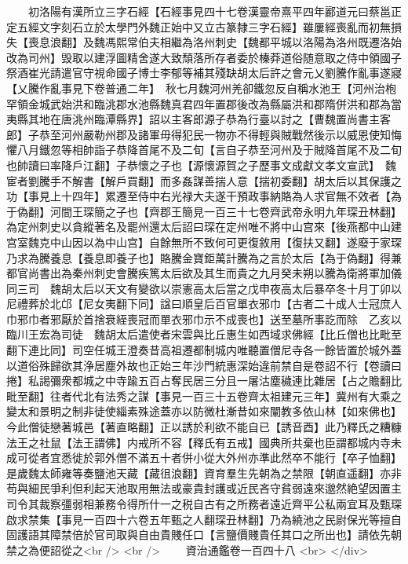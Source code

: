 　　初洛陽有漢所立三字石經【石經事見四十七卷漢靈帝熹平四年酈道元曰蔡邕正定五經文字刻石立於太學門外魏正始中又立古篆隸三字石經】雖屢經喪亂而初無損失【喪息浪翻】及魏馮熙常伯夫相繼為洛州刺史【魏都平城以洛陽為洛州既遷洛始改為司州】毁取以建浮圖精舍遂大致頹落所存者委於榛莽道俗随意取之侍中領國子祭酒崔光請遣官守視命國子博士李郁等補其殘缺胡太后許之會元乂劉騰作亂事遂寢【乂騰作亂事見下卷普通二年】　秋七月魏河州羌卻鐵忽反自稱水池王【河州治枹罕領金城武始洪和臨洮郡水池縣魏真君四年置郡後改為縣屬洪和郡隋併洪和郡為當夷縣其地在唐洮州臨潭縣界】詔以主客郎源子恭為行臺以討之【曹魏置尚書主客郎】子恭至河州嚴勒州郡及諸軍毋得犯民一物亦不得輕與賊戰然後示以威恩使知悔懼八月鐵忽等相帥詣子恭降首尾不及二旬【言自子恭至河州及于賊降首尾不及二旬也帥讀曰率降戶江翻】子恭懷之子也【源懷源賀之子歷事文成獻文孝文宣武】　魏宦者劉騰手不解書【解戶買翻】而多姦謀善揣人意【揣初委翻】胡太后以其保護之功【事見上十四年】累遷至侍中右光禄大夫遂干預政事納賂為人求官無不效者【為于偽翻】河間王琛簡之子也【齊郡王簡見一百三十七卷齊武帝永明九年琛丑林翻】為定州刺史以貪縱著名及罷州還太后詔曰琛在定州唯不將中山宫來【後燕都中山建宫室魏克中山因以為中山宫】自餘無所不致何可更復敘用【復扶又翻】遂廢于家琛乃求為騰養息【養息即養子也】賂騰金寶鉅萬計騰為之言於太后【為于偽翻】得兼都官尚書出為秦州刺史會騰疾篤太后欲及其生而貴之九月癸未朔以騰為衛將軍加儀同三司　魏胡太后以天文有變欲以崇憲高太后當之戊申夜高太后暴卒冬十月丁卯以尼禮葬於北邙【尼女夷翻下同】諡曰順皇后百官單衣邪巾【古者二十成人士冠庶人巾邪巾者邪厭於首捨衰絰喪冠而單衣邪巾示不成喪也】送至墓所事訖而除　乙亥以臨川王宏為司徒　魏胡太后遣使者宋雲與比丘惠生如西域求佛經【比丘僧也比毗至翻下連比同】司空任城王澄奏昔高祖遷都制城内唯聽置僧尼寺各一餘皆置於城外蓋以道俗殊歸欲其浄居塵外故也正始三年沙門統惠深始違前禁自是卷詔不行【卷讀曰捲】私謁彌衆都城之中寺踰五百占奪民居三分且一屠沽塵穢連比雜居【占之贍翻比毗至翻】往者代北有法秀之謀【事見一百三十五卷齊太祖建元三年】冀州有大乘之變太和景明之制非徒使緇素殊途蓋亦以防微杜漸昔如來闡教多依山林【如來佛也】今此僧徒戀著城邑【著直略翻】正以誘於利欲不能自已【誘音酉】此乃釋氏之糟糠法王之社鼠【法王謂佛】内戒所不容【釋氏有五戒】國典所共棄也臣謂都城内寺未成可從者宜悉徙於郭外僧不滿五十者併小從大外州亦準此然卒不能行【卒子恤翻】　是歲魏太師雍等奏鹽池天藏【藏徂浪翻】資育羣生先朝為之禁限【朝直遥翻】亦非苟與細民爭利但利起天池取用無法或豪貴封護或近民吝守貧弱遠來邈然絶望因置主司令其裁察彊弱相兼務令得所什一之税自古有之所務者遠近齊平公私兩宜耳及甄琛啟求禁集【事見一百四十六卷五年甄之人翻琛丑林翻】乃為繞池之民尉保光等擅自固護語其障禁倍於官司取與自由貴賤任口【言鹽價賤貴任其口之所出也】請依先朝禁之為便詔從之<br />
<br />
　　資治通鑑卷一百四十八  <br>
   </div> 

